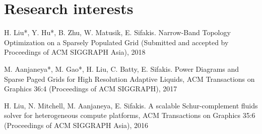 \documentclass[11pt]{article}
\begin{document}
\section*{Research interests}

\begin{thebibliography}{99}

 H. Liu*, Y. Hu*, B. Zhu, W. Matusik, E. Sifakis. Narrow-Band Topology Optimization on a Sparsely Populated Grid (Submitted and accepted by Proceedings of ACM SIGGRAPH Asia), 2018

M. Aanjaneya*, M. Gao*, H. Liu, C. Batty, E. Sifakis. Power Diagrams and Sparse Paged Grids for High Resolution Adaptive Liquids, ACM Transactions on Graphics 36:4 (Proceedings of ACM SIGGRAPH), 2017

H. Liu, N. Mitchell, M. Aanjaneya, E. Sifakis. A scalable Schur-complement fluids solver for heterogeneous compute platforms,  ACM Transactions on Graphics 35:6 (Proceedings of ACM SIGGRAPH Asia), 2016
\end{thebibliography}
\end{document}
